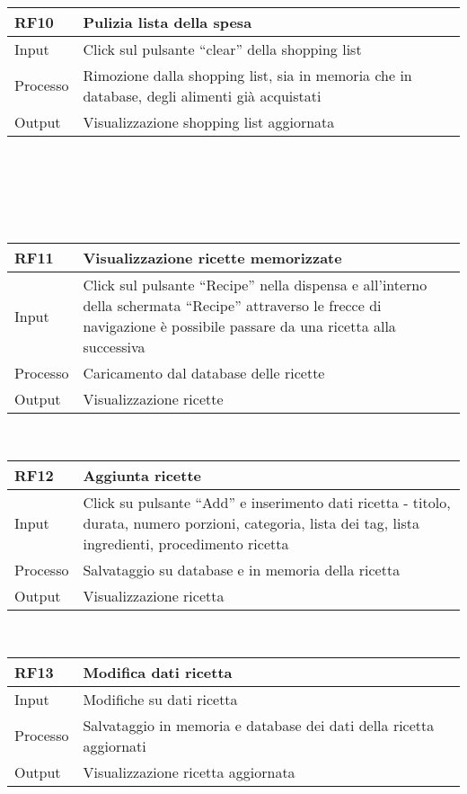 \documentclass[
]{article}
\begin{document}
~

\begin{longtable}[]{@{}ll@{}}
\toprule\noalign{}
RF10 & Pulizia lista della spesa \\
\midrule\noalign{}
\endhead
\bottomrule\noalign{}
\endlastfoot
Input & Click sul pulsante ``clear'' della shopping list \\
Processo & Rimozione dalla shopping list, sia in memoria che in
database, degli alimenti già acquistati \\
Output & Visualizzazione shopping list aggiornata \\
\end{longtable}

~

~

~

\begin{longtable}[]{@{}ll@{}}
\toprule\noalign{}
RF11 & Visualizzazione ricette memorizzate \\
\midrule\noalign{}
\endhead
\bottomrule\noalign{}
\endlastfoot
Input & Click sul pulsante ``Recipe'' nella dispensa e all'interno della
schermata ``Recipe'' attraverso le frecce di navigazione è possibile
passare da una ricetta alla successiva \\
Processo & Caricamento dal database delle ricette \\
Output & Visualizzazione ricette \\
\end{longtable}

~

\begin{longtable}[]{@{}ll@{}}
\toprule\noalign{}
RF12 & Aggiunta ricette \\
\midrule\noalign{}
\endhead
\bottomrule\noalign{}
\endlastfoot
Input & Click su pulsante ``Add'' e inserimento dati ricetta - titolo,
durata, numero porzioni, categoria, lista dei tag, lista ingredienti,
procedimento ricetta \\
Processo & Salvataggio su database e in memoria della ricetta \\
Output & Visualizzazione ricetta \\
\end{longtable}

~

\begin{longtable}[]{@{}ll@{}}
\toprule\noalign{}
RF13 & Modifica dati ricetta \\
\midrule\noalign{}
\endhead
\bottomrule\noalign{}
\endlastfoot
Input & Modifiche su dati ricetta \\
Processo & Salvataggio in memoria e database dei dati della ricetta
aggiornati \\
Output & Visualizzazione ricetta aggiornata \\
\end{longtable}
\end{document}
